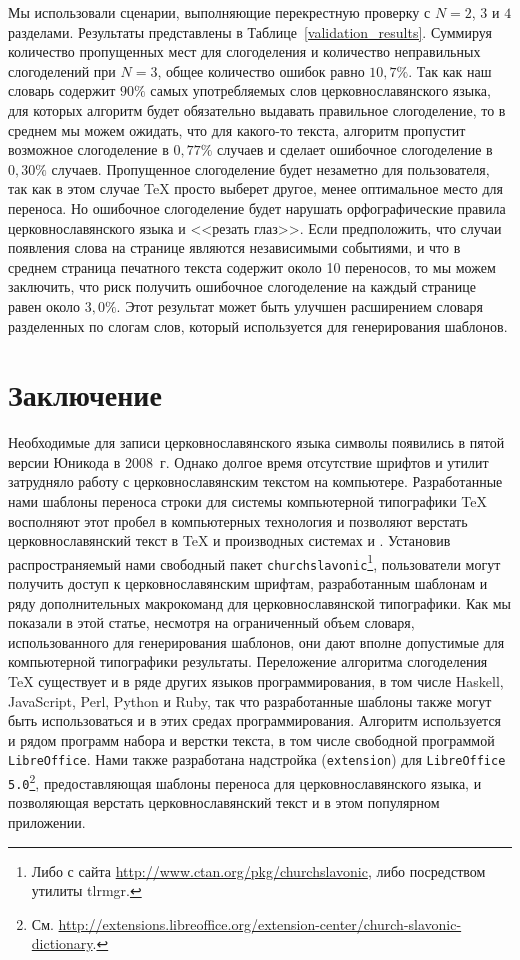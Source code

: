 \documentclass[12pt,a4paper,oneside]{extarticle}
\begin{document}
Мы использовали сценарии, выполняющие перекрестную проверку с $N = 2$, $3$ и $4$ разделами. Результаты представлены в Таблице~\ref{validation_results}. Суммируя количество пропущенных мест для слогоделения и количество неправильных слогоделений при  $N = 3$, общее количество ошибок равно $10,7\%$.  Так как наш словарь содержит $90\%$ самых употребляемых слов церковнославянского языка, для которых алгоритм будет обязательно выдавать правильное слогоделение, то в среднем мы можем ожидать, что для какого-то текста, алгоритм пропустит возможное слогоделение в $0,77\%$  случаев и сделает ошибочное слогоделение в $0,30\%$ случаев. Пропущенное слогоделение будет незаметно для пользователя, так как в этом случае \TeX{} просто выберет другое, менее оптимальное место для переноса. Но ошибочное слогоделение будет нарушать орфографические правила церковнославянского языка и <<резать глаз>>. Если предположить, что случаи появления слова на странице являются независимыми событиями, и что в среднем страница печатного текста содержит около 10 переносов, то мы можем заключить, что риск получить ошибочное слогоделение на каждый странице равен около $3,0\%$. Этот результат может быть улучшен расширением словаря разделенных по слогам слов, который используется для генерирования шаблонов.

\section{Заключение}

Необходимые для записи церковнославянского языка символы появились в пятой версии Юникода в 2008~г. Однако долгое время отсутствие шрифтов и утилит затрудняло работу с церковнославянским текстом на компьютере. Разработанные нами шаблоны переноса строки для системы компьютерной типографики \TeX{} восполняют этот пробел в компьютерных технология и позволяют верстать церковнославянский текст в \TeX{} и производных системах \XeTeX{} и \LuaTeX{}. Установив распространяемый нами свободный пакет \verb+churchslavonic+\footnote{Либо с сайта \url{http://www.ctan.org/pkg/churchslavonic}, либо посредством утилиты tlrmgr.}, пользователи могут получить доступ к церковнославянским шрифтам, разработанным шаблонам и ряду дополнительных макрокоманд для церковнославянской типографики. Как мы показали в этой статье, несмотря на ограниченный объем словаря, использованного для генерирования шаблонов, они дают вполне допустимые для компьютерной типографики результаты. Переложение алгоритма слогоделения \TeX{}  существует и в ряде других языков программирования, в том числе Haskell, JavaScript, Perl, Python и Ruby, так что разработанные шаблоны также могут быть использоваться и в этих средах программирования. Алгоритм используется и рядом программ набора и верстки текста, в том числе свободной программой \verb+LibreOffice+. Нами также разработана надстройка (\verb+extension+) для \verb+LibreOffice 5.0+\footnote{См. \url{http://extensions.libreoffice.org/extension-center/church-slavonic-dictionary}.}, предоставляющая шаблоны переноса для церковнославянского языка, и позволяющая верстать церковнославянский текст и в этом популярном приложении.

\printbibliography
\end{document}
